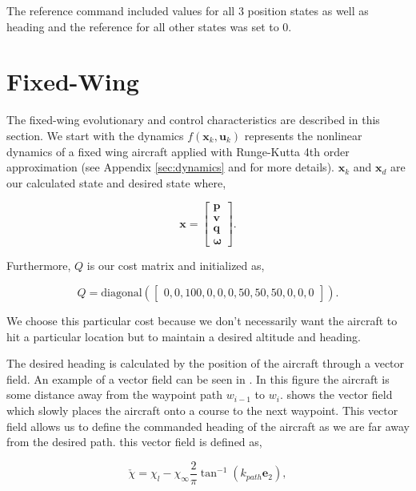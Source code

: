 \documentclass[letterpaper, 10 pt, conference]{ieeeconf}  %
\begin{document}
	The reference command included values for all 3 position states as well as heading and the reference for all other states was set to 0.
	
	
	\section{Fixed-Wing}
	\label{subsub:fw}
	
	The fixed-wing evolutionary and control characteristics are described in this section. We start with the dynamics $f(\mathbf{x}_k,\mathbf{u}_k)$ represents the nonlinear dynamics of a fixed wing aircraft applied with Runge-Kutta 4th order approximation (see Appendix \ref{sec:dynamics} and \cite{beard2012small} for more details). $\mathbf{x}_k$ and $\mathbf{x}_{d}$ are our calculated state and desired state where,
	
	\begin{equation}
	\label{eq:lqr_current_desired_states}
	\mathbf{x}=\begin{bmatrix}\mathbf{p} \\ \mathbf{v} \\ \mathbf{q} \\ \boldsymbol{\omega}\end{bmatrix}.
	\end{equation}
	
	Furthermore, $Q$ is our cost matrix and initialized as,
	
	\begin{equation}
	Q = \text{diagonal}(\begin{bmatrix}
	0,0,100,0,0,0,50,50,50,0,0,0
	\end{bmatrix}).
	\end{equation}
	
	We choose this particular cost because we don't necessarily want the aircraft to hit a particular location but to maintain a desired altitude and heading. 
	
	The desired heading is calculated by the position of the aircraft through a vector field. An example of a vector field can be seen in . In this figure the aircraft is some distance away from the waypoint path $w_{i-1}$ to $w_i$.  shows the vector field which slowly places the aircraft onto a course to the next waypoint. This vector field allows us to define the commanded heading of the aircraft as we are far away from the desired path. this vector field is defined as,
	
	\begin{equation}
	\check{\chi}=\chi_{l}-\chi_{\infty}\frac{2}{\pi}\tan^{-1}\left(k_{path}\mathbf{e}_{2}\right),
	\end{equation}
	
\end{document}
